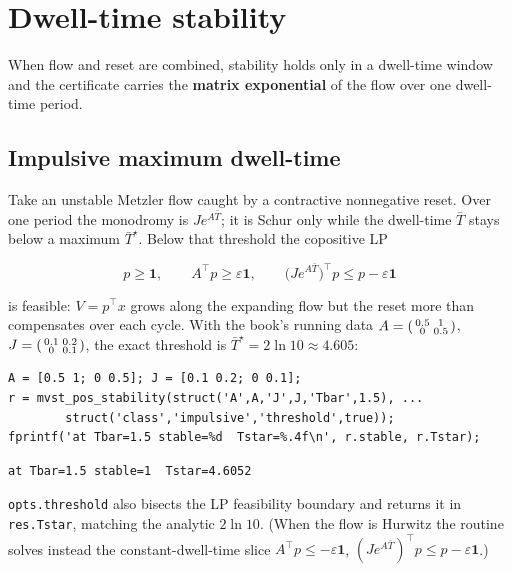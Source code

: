 \documentclass[11pt,oneside]{report}
\newcommand{\code}[1]{\texttt{#1}}
\newenvironment{psmallmatrix}%
  {\left(\begin{smallmatrix}}%
  {\end{smallmatrix}\right)}
\begin{document}
\hypertarget{dwell-time-stability}{%
\section{Dwell-time stability}\label{dwell-time-stability}}

When flow and reset are combined, stability holds only in a dwell-time window
and the certificate carries the \textbf{matrix exponential} of the flow over one
dwell-time period.

\hypertarget{impulsive-maximum-dwell-time}{%
\subsection{Impulsive maximum dwell-time}\label{impulsive-maximum-dwell-time}}

Take an unstable Metzler flow caught by a contractive nonnegative reset. Over one
period the monodromy is \(J e^{A \bar T}\); it is Schur only while the dwell-time
\(\bar T\) stays below a maximum \(\bar T^\star\). Below that threshold the
copositive LP

\[
p \ge \mathbf{1},
\qquad
A^\top p \ge \varepsilon \mathbf{1},
\qquad
\bigl(J e^{A \bar T}\bigr)^\top p \le p - \varepsilon \mathbf{1}
\]

is feasible: \(V = p^\top x\) grows along the expanding flow but the reset more
than compensates over each cycle. With the book's running data
\(A = \begin{psmallmatrix} 0.5 & 1 \\ 0 & 0.5 \end{psmallmatrix}\),
\(J = \begin{psmallmatrix} 0.1 & 0.2 \\ 0 & 0.1 \end{psmallmatrix}\), the exact
threshold is \(\bar T^\star = 2\ln 10 \approx 4.605\):

\begin{lstlisting}[style=matlabstyle]
A = [0.5 1; 0 0.5]; J = [0.1 0.2; 0 0.1];
r = mvst_pos_stability(struct('A',A,'J',J,'Tbar',1.5), ...
        struct('class','impulsive','threshold',true));
fprintf('at Tbar=1.5 stable=%d  Tstar=%.4f\n', r.stable, r.Tstar);
\end{lstlisting}

\begin{lstlisting}[style=outputstyle]
at Tbar=1.5 stable=1  Tstar=4.6052
\end{lstlisting}

\code{opts.threshold} also bisects the LP feasibility boundary and returns it in
\code{res.Tstar}, matching the analytic \(2\ln 10\). (When the flow is Hurwitz the
routine solves instead the constant-dwell-time slice \(A^\top p \le -\varepsilon\mathbf 1\),
\((J e^{A \bar T})^\top p \le p - \varepsilon\mathbf 1\).)
\end{document}

